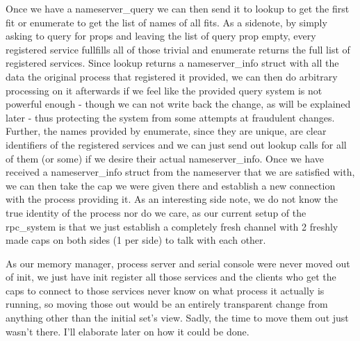 Once we have a nameserver\_query we can then send it to lookup to get the first fit or enumerate to get the list of names of all fits.
As a sidenote, by simply asking to query for props and leaving the list of query prop empty, every registered service fullfills all of those trivial and enumerate returns the full list of registered services.
Since lookup returns a nameserver\_info struct with all the data the original process that registered it provided, we can then do arbitrary processing on it afterwards if we feel like the provided query system is not powerful enough - though we can not write back the change, as will be explained later - thus protecting the system from some attempts at fraudulent changes.
Further, the names provided by enumerate, since they are unique, are clear identifiers of the registered services and we can just send out lookup calls for all of them (or some) if we desire their actual nameserver\_info.
Once we have received a nameserver\_info struct from the nameserver that we are satisfied with, we can then take the cap we were given there and establish a new connection with the process providing it. As an interesting side note, we do not know the true identity of the process nor do we care, as our current setup of the rpc\_system is that we just establish a completely fresh channel with 2 freshly made caps on both sides (1 per side) to talk with each other.
\medskip

As our memory manager, process server and serial console were never moved out of init, we just have init register all those services and the clients who get the caps to connect to those services never know on what process it actually is running, so moving those out would be an entirely transparent change from anything other than the initial set's view. Sadly, the time to move them out just wasn't there. I'll elaborate later on how it could be done.
\medskip

